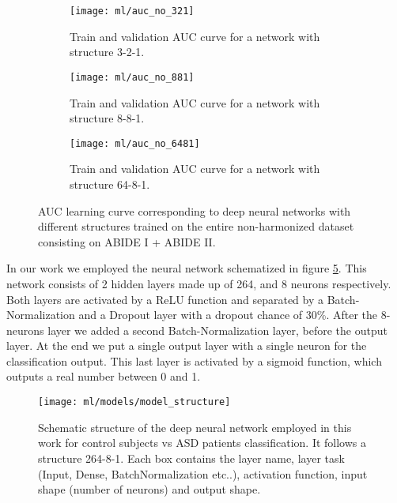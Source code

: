 \documentclass[11pt]{report}
\begin{document}
\begin{figure}
\centering
\begin{subfigure}[b]{0.3\textwidth}
   \texttt{[image: ml/auc\_no\_321]}
   \caption{Train and validation AUC curve for a network with structure 3-2-1.}
   \label{fig:auc_no3-2-1}
\end{subfigure}
\begin{subfigure}[b]{0.3\textwidth}
   \texttt{[image: ml/auc\_no\_881]}
   \caption{Train and validation AUC curve for a network with structure 8-8-1.}
   \label{fig:auc_no8-8-1}
\end{subfigure}
\begin{subfigure}[b]{0.3\textwidth}
   \texttt{[image: ml/auc\_no\_6481]}
   \caption{Train and validation AUC curve for a network with structure 64-8-1.}
   \label{fig:auc_no64-8-1}
\end{subfigure}
\caption{AUC learning curve corresponding to deep neural networks with different structures trained on the entire non-harmonized dataset consisting on ABIDE I + ABIDE II.}
\label{fig:learningcurve}
\end{figure}


\hfill

In our work we employed the neural network schematized in figure \ref{fig:model_structure}.
This network consists of 2 hidden layers made up of 264, and 8 neurons respectively. 
Both layers are activated by a ReLU function and separated by a Batch-Normalization and a Dropout layer with a dropout chance of 30\%.
After the 8-neurons layer we added a second Batch-Normalization layer, before the output layer.
At the end we put a single output layer with a single neuron for the classification output.
This last layer is activated by a sigmoid function, which outputs a real number between 0 and 1.



\begin{figure}[h!]
\centering
\texttt{[image: ml/models/model\_structure]}
\caption{Schematic structure of the deep neural network employed in this work for control subjects vs ASD patients classification. It follows a structure 264-8-1.
Each box contains the layer name, layer task (Input, Dense, BatchNormalization etc..), activation function, input shape (number of neurons) and output shape.}
\label{fig:model_structure}
\end{figure}
\end{document}
